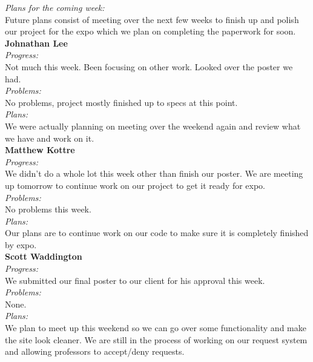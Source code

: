 \noindent\textit{Plans for the coming week:}\\
\noindent Future plans consist of meeting over the next few weeks to finish up and polish our project for the expo which we plan on completing the paperwork for soon.\\

\noindent\textbf{Johnathan Lee}\\
\noindent\textit{Progress:}\\
Not much this week. Been focusing on other work. Looked over the poster we had. \\ 

\noindent\textit{Problems:}\\
\noindent No problems, project mostly finished up to specs at this point.\\

\noindent\textit{Plans:}\\
\noindent We were actually planning on meeting over the weekend again and review what we have and work on it.\\

\noindent\textbf{Matthew Kottre}\\
\noindent\textit{Progress:}\\
We didn't do a whole lot this week other than finish our poster. We are meeting up tomorrow to continue work on our project to get it ready for expo.\\

\noindent\textit{Problems:}\\
\noindent No problems this week.\\

\noindent\textit{Plans:}\\
\noindent Our plans are to continue work on our code to make sure it is completely finished by expo.\\

\noindent\textbf{Scott Waddington}\\
\noindent\textit{Progress:}\\
We submitted our final poster to our client for his approval this week.\\

\noindent\textit{Problems:}\\
\noindent None.\\

\noindent\textit{Plans:}\\
\noindent We plan to meet up this weekend so we can go over some functionality and make the site look cleaner. We are still in the process of working on our request system and allowing professors to accept/deny requests.\\

